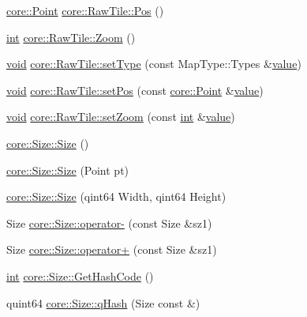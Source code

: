 \begin{DoxyCompactItemize}
\item 
\hyperlink{structcore_1_1_point}{core\-::\-Point} \hyperlink{group___o_p_map_widget_ga1c62f80ba95a32840e72ccfa745f503f}{core\-::\-Raw\-Tile\-::\-Pos} ()
\item 
\hyperlink{ioapi_8h_a787fa3cf048117ba7123753c1e74fcd6}{int} \hyperlink{group___o_p_map_widget_gabd1ed75e92f807c70de10034d9d5dda4}{core\-::\-Raw\-Tile\-::\-Zoom} ()
\item 
\hyperlink{group___u_a_v_objects_plugin_ga444cf2ff3f0ecbe028adce838d373f5c}{void} \hyperlink{group___o_p_map_widget_gaa1c1e525ae0bd6aa39e0d3535cb696c8}{core\-::\-Raw\-Tile\-::set\-Type} (const Map\-Type\-::\-Types \&\hyperlink{glext_8h_aa0e2e9cea7f208d28acda0480144beb0}{value})
\item 
\hyperlink{group___u_a_v_objects_plugin_ga444cf2ff3f0ecbe028adce838d373f5c}{void} \hyperlink{group___o_p_map_widget_ga1c6d9581bee67f1fd163df34471594da}{core\-::\-Raw\-Tile\-::set\-Pos} (const \hyperlink{structcore_1_1_point}{core\-::\-Point} \&\hyperlink{glext_8h_aa0e2e9cea7f208d28acda0480144beb0}{value})
\item 
\hyperlink{group___u_a_v_objects_plugin_ga444cf2ff3f0ecbe028adce838d373f5c}{void} \hyperlink{group___o_p_map_widget_ga74673bcbb15e8d7c09ef6e909d40a813}{core\-::\-Raw\-Tile\-::set\-Zoom} (const \hyperlink{ioapi_8h_a787fa3cf048117ba7123753c1e74fcd6}{int} \&\hyperlink{glext_8h_aa0e2e9cea7f208d28acda0480144beb0}{value})
\item 
\hyperlink{group___o_p_map_widget_gaf57b3247af9a9399f85615e6ad8a6981}{core\-::\-Size\-::\-Size} ()
\item 
\hyperlink{group___o_p_map_widget_ga03e339782ac393b92ad72e1d850589f6}{core\-::\-Size\-::\-Size} (Point pt)
\item 
\hyperlink{group___o_p_map_widget_gab8baf4ac21066099566fc15ba5f9542d}{core\-::\-Size\-::\-Size} (qint64 Width, qint64 Height)
\item 
Size \hyperlink{group___o_p_map_widget_ga5d0fdc38eda28a8c6bb71c421cb18150}{core\-::\-Size\-::operator-\/} (const Size \&sz1)
\item 
Size \hyperlink{group___o_p_map_widget_gacede8c8f61fa4e8ab03f0780af61b66b}{core\-::\-Size\-::operator+} (const Size \&sz1)
\item 
\hyperlink{ioapi_8h_a787fa3cf048117ba7123753c1e74fcd6}{int} \hyperlink{group___o_p_map_widget_ga8e9b3c1ccd7f2e2d5a6f9c4767c06043}{core\-::\-Size\-::\-Get\-Hash\-Code} ()
\item 
quint64 \hyperlink{group___o_p_map_widget_ga1f7482f21c86bc1b02f1e6d8ab2de12c}{core\-::\-Size\-::q\-Hash} (Size const \&)

\end{DoxyCompactItemize}
